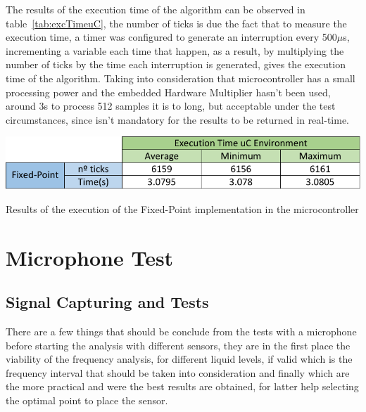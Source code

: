 The results of the execution time of the algorithm can be observed in table~\ref{tab:excTimeuC}, the number of ticks is due the fact that to measure the execution time, a timer was configured to generate an interruption every 500$\mu$s, incrementing a variable each time that happen, as a result, by multiplying the number of ticks by the time each interruption is generated, gives the execution time of the algorithm. Taking into consideration that microcontroller has a small processing power and the embedded Hardware Multiplier hasn't been used, around 3s to process 512 samples it is to long, but acceptable under the test circumstances, since isn't mandatory for the results to be returned in real-time.  
\begin{table}
    \centering
    \includegraphics[width=1\textwidth]{Chapters/6CHP/Figures/excTimeuC.pdf}
    \caption{Results of the execution of the Fixed-Point implementation in the microcontroller}
    \label{tab:excTimeuC}
\end{table}
\section{Microphone Test}\label{sec:MicroTests}
\subsection{Signal Capturing and Tests}

There are a few things that should be conclude from the tests with a microphone before starting the analysis with different sensors, they are in the first place the viability of the frequency analysis, for different liquid levels, if valid which is the frequency interval that should be taken into consideration and finally which are the more practical and were the best results are obtained, for latter help selecting the optimal point to place the sensor. 

